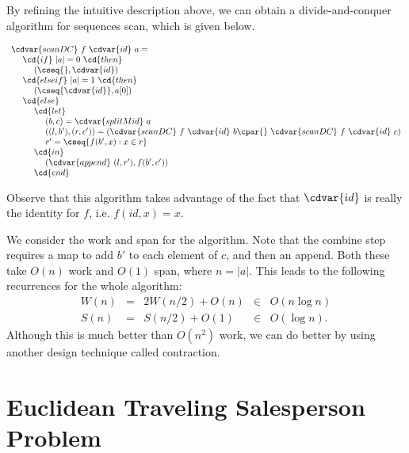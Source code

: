 \begin{algorithm}
By refining the intuitive description above, we can obtain a
divide-and-conquer algorithm for sequences scan, which is given below.

\[
\begin{array}{l}
\cdvar{scanDC}~f~\cdvar{id}~a =
\\
~~~~\cd{if}~|a| = 0~\cd{then}
\\
~~~~~~~~(\cseq{}, \cdvar{id})
\\
~~~~\cd{else if}~|a| = 1~\cd{then}
\\ 
~~~~~~~~(\cseq{\cdvar{id}},a[0])
\\
~~~~\cd{else}
\\ 
~~~~~~~~\cd{let}
\\ 
~~~~~~~~~~~~(b, c) = \cdvar{splitMid}~a
\\
~~~~~~~~~~~~((l,b'),(r,c')) = (\cdvar{scanDC}~f~\cdvar{id}~b \cpar{}~\cdvar{scanDC}~f~\cdvar{id}~c)
\\
~~~~~~~~~~~~r' = \cseq{f (b',x) : x \in r}
\\
~~~~~~~~\cd{in}
\\
~~~~~~~~~~~~(\cdvar{append}~(l,r'), f(b',c'))
\\
~~~~~~~~\cd{end}
\end{array}
\]
\end{algorithm}
%

\begin{remark}
Observe that this algorithm takes advantage of the fact that $\cdvar{id}$ is
really the identity for $f$, i.e. $f(id,x) = x$.
\end{remark}

\begin{gram}
We consider the work and span for the algorithm.  Note that the
combine step requires a map to add $b'$ to each element of $c$, and
then an append.  Both these take $O(n)$ work and $O(1)$ span, where $n
= |a|$.
%
This leads to the following recurrences for the whole
algorithm:
\[
\begin{array}{lllll}
W(n) & = & 2W(n/2) + O(n) & \in &  O(n \log n)
\\
S(n) & = & S(n/2) + O(1) & \in & O(\log n).
\end{array}
\]
Although this is much better than $O(n^2)$ work, we can do better by
using another design technique called contraction.
\end{gram}


\section{Euclidean Traveling Salesperson Problem}
\label{sec:design::dc::etsp}

